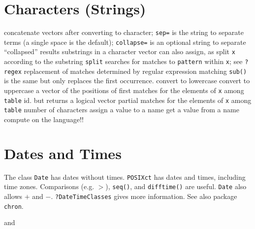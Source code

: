 \section{Characters (Strings)}{}

	{concatenate vectors after converting to character; {\tt sep=} is the string to separate terms (a single space is the default); {\tt collapse=} is an optional string to separate ``collapsed'' results}
	{substrings in a character vector}
	{can also assign, as}
	{split {\tt x} according to the substring {\tt split}}
	{searches for matches to {\tt pattern} within {\tt x}; see {\tt ?regex}}
	{replacement of matches determined by regular expression matching {\tt sub()} is the same but only replaces the first occurrence.}
	{convert to lowercase}
	{convert to uppercase}
	{a vector of the positions of first matches for the elements of {\tt x} among {\tt table}}
	{id. but returns a logical vector}
	{partial matches for the elements of {\tt x} among {\tt table}}
	{number of characters}
	{assign a value to a name}
	{get a value from a name}
	{compute on the language!!}

\section{Dates and Times}{
The class {\tt Date} has dates without times.  {\tt POSIXct} has
dates and times, including time zones. Comparisons (e.g. $>$),
{\tt seq()}, and {\tt difftime()} are useful. {\tt Date} also allows
$+$ and $-$. {\tt ?DateTimeClasses} gives more information. See also package
{\tt chron}.}

	{and}

